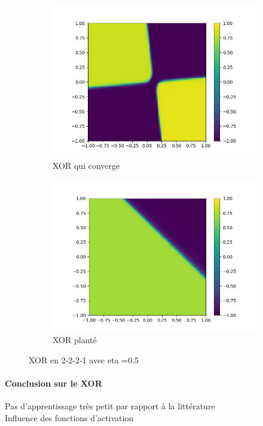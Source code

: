 \begin{figure}[ht!]
  \centering
  \begin{subfigure}[b]{.4\linewidth}
    \includegraphics[width=\linewidth]{fig/xor2221_eta05.png}
    \caption{XOR qui converge}
    \label{fig:_05}
  \end{subfigure}
  \quad
  \begin{subfigure}[b]{.4\linewidth}
    \includegraphics[width=\linewidth]{fig/xor2221_eta05v2.png}
    \caption{XOR planté}
  \end{subfigure}
  \caption{XOR en 2-2-2-1 avec eta =0.5}
  \label{fig:2_2_2_1_instable}
\end{figure}

\paragraph{Conclusion sur le XOR} %
\label{par:conclusion_sur_le_xor}
Pas d'apprentissage très petit par rapport à la littérature\\
Influence des fonctions d'activation

